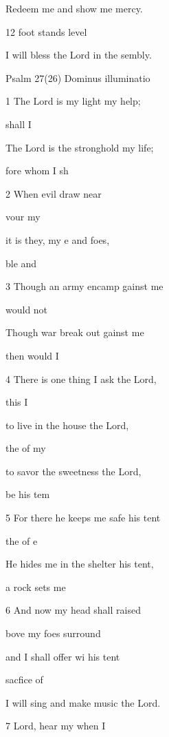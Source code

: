 Redeem me and show me  mercy. 

12  foot stands  level  

I will bless the Lord in the sembly. 

Psalm 27(26) Dominus illuminatio 


1 The Lord is my light  my help; 

  shall I  

The Lord is the stronghold  my life; 

fore whom  I sh 

2 When evil draw near 

 vour my  

it is they, my e and foes, 

 ble and  

3 Though an army encamp gainst me 

  would not  

Though war break out gainst me 

 then would I  

4 There is one thing I ask  the Lord, 

  this I  

to live in the house  the Lord, 

 the  of my  

to savor the sweetness  the Lord, 

 be his tem 

5 For there he keeps me safe  his tent 

 the  of e 

He hides me in the shelter  his tent, 

 a rock  sets me  

6 And now my head shall  raised 

bove my foes  surround  

and I shall offer wi his tent 

 sacfice of  

I will sing and make music  the Lord. 

7  Lord, hear my  when I  


